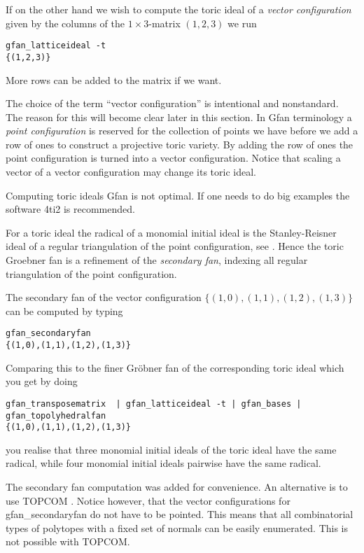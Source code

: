 If on the other hand we wish to compute the toric ideal of a \emph{vector configuration} given by the columns of the $1\times 3$-matrix $(1,2,3)$ we run
\begin{verbatim}
gfan_latticeideal -t
{(1,2,3)}
\end{verbatim}
More rows can be added to the matrix if we want.

The choice of the term ``vector configuration'' is intentional and nonstandard. The reason for this will become clear later in this section. In Gfan terminology a \emph{point configuration} is reserved for the collection of points we have before we add a row of ones to construct a projective toric variety. By adding the row of ones the point configuration is turned into a vector configuration.
Notice that scaling a vector of a vector configuration may change its toric ideal.

Computing toric ideals Gfan is not optimal. If one needs to do big examples the software 4ti2 \cite{4ti2} is recommended.

For a toric ideal the radical of a monomial initial ideal is the Stanley-Reisner ideal of a regular triangulation of the point configuration, see \cite{sturmfels}. Hence the toric Groebner fan is a refinement of the \emph{secondary fan}, indexing all regular triangulation of the point configuration.

The secondary fan of the vector configuration $\{(1,0),(1,1),(1,2),(1,3)\}$ can be computed by typing
\begin{verbatim}
gfan_secondaryfan
{(1,0),(1,1),(1,2),(1,3)}
\end{verbatim}
Comparing this to the finer Gr\"obner fan of the corresponding toric ideal which you get by doing
\begin{footnotesize}
\begin{verbatim}
gfan_transposematrix  | gfan_latticeideal -t | gfan_bases | gfan_topolyhedralfan 
{(1,0),(1,1),(1,2),(1,3)}
\end{verbatim}
\end{footnotesize}
you realise that three monomial initial ideals of the toric ideal have the same radical, while four monomial initial ideals pairwise have the same radical.

The secondary fan computation was added for convenience.
An alternative is to use
TOPCOM \cite{rambau}.  Notice however, that the vector configurations
for gfan\_secondaryfan do not have to be pointed. This means that
all combinatorial types of polytopes with a fixed set of normals can
be easily enumerated. This is not possible with TOPCOM.
